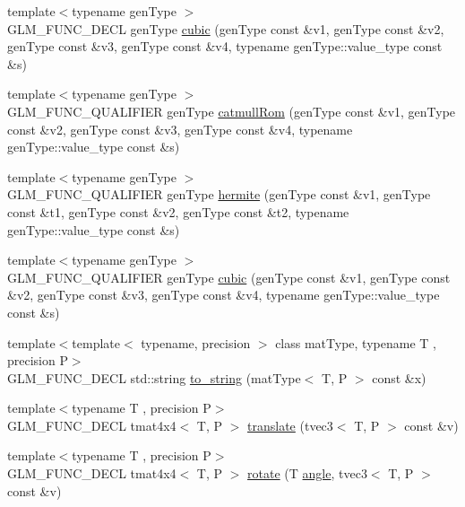 \begin{DoxyCompactItemize}
\item 
{\footnotesize template$<$typename gen\+Type $>$ }\\G\+L\+M\+\_\+\+F\+U\+N\+C\+\_\+\+D\+E\+C\+L gen\+Type \hyperlink{group__gtx__spline_ga6b867eb52e2fc933d2e0bf26aabc9a70}{cubic} (gen\+Type const \&v1, gen\+Type const \&v2, gen\+Type const \&v3, gen\+Type const \&v4, typename gen\+Type\+::value\+\_\+type const \&s)
\item 
{\footnotesize template$<$typename gen\+Type $>$ }\\G\+L\+M\+\_\+\+F\+U\+N\+C\+\_\+\+Q\+U\+A\+L\+I\+F\+I\+E\+R gen\+Type \hyperlink{group__gtx__spline_ga8119c04f8210fd0d292757565cd6918d}{catmull\+Rom} (gen\+Type const \&v1, gen\+Type const \&v2, gen\+Type const \&v3, gen\+Type const \&v4, typename gen\+Type\+::value\+\_\+type const \&s)
\item 
{\footnotesize template$<$typename gen\+Type $>$ }\\G\+L\+M\+\_\+\+F\+U\+N\+C\+\_\+\+Q\+U\+A\+L\+I\+F\+I\+E\+R gen\+Type \hyperlink{group__gtx__spline_gaa69e143f6374d32f934a8edeaa50bac9}{hermite} (gen\+Type const \&v1, gen\+Type const \&t1, gen\+Type const \&v2, gen\+Type const \&t2, typename gen\+Type\+::value\+\_\+type const \&s)
\item 
{\footnotesize template$<$typename gen\+Type $>$ }\\G\+L\+M\+\_\+\+F\+U\+N\+C\+\_\+\+Q\+U\+A\+L\+I\+F\+I\+E\+R gen\+Type \hyperlink{group__gtx__spline_ga6b867eb52e2fc933d2e0bf26aabc9a70}{cubic} (gen\+Type const \&v1, gen\+Type const \&v2, gen\+Type const \&v3, gen\+Type const \&v4, typename gen\+Type\+::value\+\_\+type const \&s)
\item 
{\footnotesize template$<$template$<$ typename, precision $>$ class mat\+Type, typename T , precision P$>$ }\\G\+L\+M\+\_\+\+F\+U\+N\+C\+\_\+\+D\+E\+C\+L std\+::string \hyperlink{group__gtx__string__cast_ga7b4f9233593bbf1d53762f801ef56fe6}{to\+\_\+string} (mat\+Type$<$ T, P $>$ const \&x)
\item 
{\footnotesize template$<$typename T , precision P$>$ }\\G\+L\+M\+\_\+\+F\+U\+N\+C\+\_\+\+D\+E\+C\+L tmat4x4$<$ T, P $>$ \hyperlink{group__gtx__transform_ga838c4505ef7f254ed05117b1ac9691fb}{translate} (tvec3$<$ T, P $>$ const \&v)
\item 
{\footnotesize template$<$typename T , precision P$>$ }\\G\+L\+M\+\_\+\+F\+U\+N\+C\+\_\+\+D\+E\+C\+L tmat4x4$<$ T, P $>$ \hyperlink{group__gtx__transform_ga2020c91bf61e050882b3a5c18eada700}{rotate} (T \hyperlink{group__gtc__quaternion_gad4a4448baedb198b2b1e7880d2544dc9}{angle}, tvec3$<$ T, P $>$ const \&v)

\end{DoxyCompactItemize}
